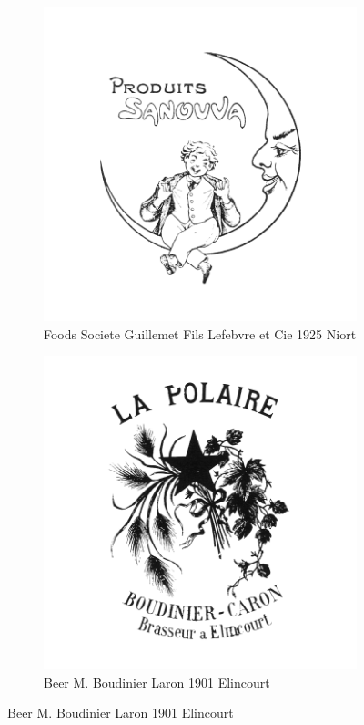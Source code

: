 \begin{figure}[h]
  \centering
  \begin{subfigure}{.45\textwidth}
    \centering
    \includegraphics[width=.5\linewidth]{images/supplement/trademarks/french/8_16}
    \caption[]{Foods Societe Guillemet Fils Lefebvre et Cie 1925 Niort}
    \label{fig:trademarks:french:8.16}
  \end{subfigure}\hfill
  \begin{subfigure}{.45\textwidth}
    \centering
    \includegraphics[width=.5\linewidth]{images/supplement/trademarks/french/8_25}
    \caption[]{Beer M. Boudinier Laron 1901 Elincourt}
    \label{fig:trademarks:french:8.25}
  \end{subfigure}


\end{figure}

